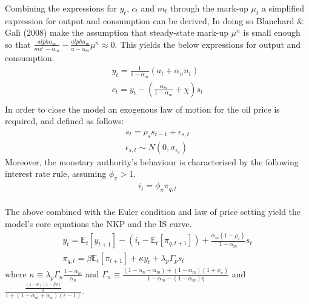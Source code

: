 \documentclass[12pt,a4paper,english]{article} %
\newcommand{\E}{\mathbb{E}} %
\begin{document}
	Combining the expressions for $y_t$, $c_t$ and $m_t$ through the mark-up $\mu_t$ a simplified expression for output and consumption can be derived, In doing so Blanchard \& Galì (2008) make the assumption that steady-state mark-up $\mu^n$ is small enough so that $\frac{alpha_m}{mc^r - \alpha_m}-\frac{alpha_m}{a - \alpha_m} \mu^n \approx 0$. This yields the below expressions for output and consumption.
	\begin{equation}
		\begin{aligned}
			y_t = \frac{1}{1-\alpha_m} (a_t + \alpha_n n_t) \\
			c_t = y_t - (\frac{\alpha_m}{1-\alpha_m} + \chi) s_t \\
		\end{aligned}
	\end{equation}
	In order to close the model an exogenous law of motion for the oil price is required, and defined as follows: 
	\begin{equation}
		\begin{aligned}
			s_t = \rho_s s_{t-1} + \epsilon_{s,t} \\
			\epsilon_{s,t} \sim N(0, \sigma_{\epsilon_{s}})
		\end{aligned}
	\end{equation}
	Moreover, the monetary authority's behaviour is characterised by the following interest rate rule, assuming $\phi_{\pi}>1$. 
	\begin{equation}
		\begin{aligned}
			i_t = \phi_{\pi} \pi_{q,t} \\
		\end{aligned}
	\end{equation}

	The above combined with the Euler condition and law of price setting yield the model's core equations the \ac{NKP} and the \ac{IS} curve.
	\begin{equation}
		\begin{aligned}
			y_t = \E_t[y_{t+1}] - (i_t - \E_t[\pi_{q,t+1}]) + \frac{\alpha_m (1-\rho_s)}{1-\alpha_m} s_t \\
			\pi_{q,t} = \beta \E_t[\pi_{t+1}] + \kappa y_t + \lambda_p \Gamma_p s_t
		\end{aligned}
	\end{equation}
	where $\kappa \equiv \lambda_p \Gamma_n \frac{1-\alpha_m}{\alpha_n}$ and 
	$\Gamma_n \equiv \frac{(1 - \alpha_n - \alpha_m) + (1 - \alpha_m) (1 + \phi_{\pi})}{1 - \alpha_m - (1 - \alpha_m) \eta}$
	and $\frac{\frac{(1 - \theta)(1 - \beta \theta)}{\theta}}{1 + (1 - \alpha_m + \alpha_n)(\epsilon - 1)}$.
	
\end{document}
